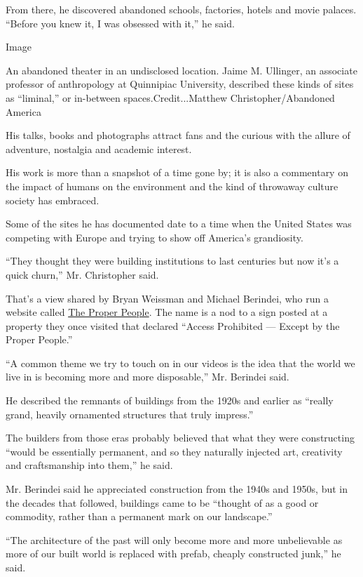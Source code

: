 From there, he discovered abandoned schools, factories, hotels and movie
palaces. ``Before you knew it, I was obsessed with it,'' he said.

Image

An abandoned theater in an undisclosed location. Jaime M. Ullinger, an
associate professor of anthropology at Quinnipiac University, described
these kinds of sites as ``liminal,'' or in-between
spaces.Credit...Matthew Christopher/Abandoned America

His talks, books and photographs attract fans and the curious with the
allure of adventure, nostalgia and academic interest.

His work is more than a snapshot of a time gone by; it is also a
commentary on the impact of humans on the environment and the kind of
throwaway culture society has embraced.

Some of the sites he has documented date to a time when the United
States was competing with Europe and trying to show off America's
grandiosity.

``They thought they were building institutions to last centuries but now
it's a quick churn,'' Mr. Christopher said.

That's a view shared by Bryan Weissman and Michael Berindei, who run a
website called \href{https://theproperpeople.com/about/}{The Proper
People}. The name is a nod to a sign posted at a property they once
visited that declared ``Access Prohibited --- Except by the Proper
People.''

``A common theme we try to touch on in our videos is the idea that the
world we live in is becoming more and more disposable,'' Mr. Berindei
said.

He described the remnants of buildings from the 1920s and earlier as
``really grand, heavily ornamented structures that truly impress.''

The builders from those eras probably believed that what they were
constructing ``would be essentially permanent, and so they naturally
injected art, creativity and craftsmanship into them,'' he said.

Mr. Berindei said he appreciated construction from the 1940s and 1950s,
but in the decades that followed, buildings came to be ``thought of as a
good or commodity, rather than a permanent mark on our landscape.''

``The architecture of the past will only become more and more
unbelievable as more of our built world is replaced with prefab, cheaply
constructed junk,'' he said.

